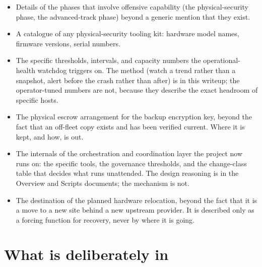 \documentclass[12pt]{article}
\begin{document}
\begin{itemize}[leftmargin=18pt,itemsep=2pt]
  \item Details of the phases that involve offensive capability (the physical-security phase, the advanced-track phase) beyond a generic mention that they exist.
  \item A catalogue of any physical-security tooling kit: hardware model names, firmware versions, serial numbers.
  \item The specific thresholds, intervals, and capacity numbers the operational-health watchdog triggers on. The method (watch a trend rather than a snapshot, alert before the crash rather than after) is in this writeup; the operator-tuned numbers are not, because they describe the exact headroom of specific hosts.
  \item The physical escrow arrangement for the backup encryption key, beyond the fact that an off-fleet copy exists and has been verified current. Where it is kept, and how, is out.
  \item The internals of the orchestration and coordination layer the project now runs on: the specific tools, the governance thresholds, and the change-class table that decides what runs unattended. The design reasoning is in the Overview and Scripts documents; the mechanism is not.
  \item The destination of the planned hardware relocation, beyond the fact that it is a move to a new site behind a new upstream provider. It is described only as a forcing function for recovery, never by where it is going.
\end{itemize}

\section{What is deliberately in}
\end{document}
